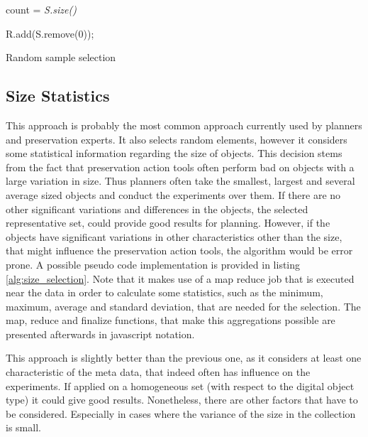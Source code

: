 \begin{algorithm}[H]
\SetAlgoLined
{}

 \BlankLine

count = \textit{S.size()}\; 
 
  {
    {
   	R.add(S.remove(0));
   }
 }
 \caption{Random sample selection}
 \label{alg:random_selection}
\end{algorithm}

\subsection{Size Statistics}
This approach is probably the most common approach currently used by planners and preservation experts. It also selects random elements, however it considers some statistical information regarding the size of objects. This decision stems from the fact that preservation action tools often perform bad on objects with a large variation in size. Thus planners often take the smallest, largest and several average sized objects and conduct the experiments over them. If there are no other significant variations and differences in the objects, the selected representative set, could provide good results for planning. However, if the objects have significant variations in other characteristics other than the size, that might influence the preservation action tools, the algorithm would be error prone. A possible pseudo code implementation is provided in listing \ref{alg:size_selection}. Note that it makes use of a map reduce job that is executed near the data in order to calculate some statistics, such as the minimum, maximum, average and standard deviation, that are needed for the selection. The map, reduce and finalize functions, that make this aggregations possible are presented afterwards in javascript notation.

This approach is slightly better than the previous one, as it considers at least one characteristic of the meta data, that indeed often has influence on the experiments. If applied on a homogeneous set (with respect to the digital object type) it could give good results. Nonetheless, there are other factors that have to be considered. Especially in cases where the variance of the size in the collection is small.

